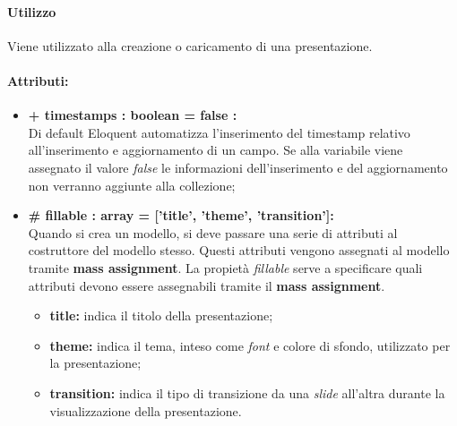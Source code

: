 	\paragraph{Utilizzo}
	Viene utilizzato alla creazione o caricamento di una presentazione.
	
	\paragraph{Attributi:}
	\begin{itemize}
		\item \textbf{+ timestamps : boolean = false :}\\
		Di default Eloquent automatizza l'inserimento del timestamp relativo all'inserimento e aggiornamento di un campo. Se alla variabile viene assegnato il valore \textit{false} le informazioni dell'inserimento e del aggiornamento non verranno aggiunte alla collezione;
		\item \textbf{\# fillable : array = ['title', 'theme', 'transition']:}\\
		Quando si crea un modello, si deve passare una serie di attributi al costruttore del modello stesso. Questi attributi vengono assegnati al modello tramite \textbf{mass assignment}. La propietà \textit{fillable} serve a specificare quali attributi devono essere assegnabili tramite il \textbf{mass assignment}.
		\begin{itemize}
			\item \textbf{title:} indica il titolo della presentazione;
			\item \textbf{theme:} indica il tema, inteso come \textit{font} e colore di sfondo, utilizzato per la presentazione;
			\item \textbf{transition:} indica il tipo di transizione da una \textit{slide} all'altra durante la visualizzazione della presentazione.
		\end{itemize}
	\end{itemize}

